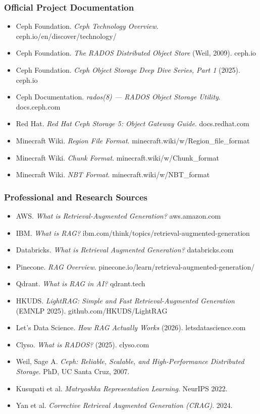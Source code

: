 \documentclass[11pt,letterpaper]{article}
\begin{document}
\subsubsection{Official Project Documentation}
\begin{itemize}[leftmargin=1.5em]
  \item Ceph Foundation. \textit{Ceph Technology Overview}. ceph.io/en/discover/technology/
  \item Ceph Foundation. \textit{The RADOS Distributed Object Store} (Weil, 2009). ceph.io
  \item Ceph Foundation. \textit{Ceph Object Storage Deep Dive Series, Part 1} (2025). ceph.io
  \item Ceph Documentation. \textit{rados(8) --- RADOS Object Storage Utility}. docs.ceph.com
  \item Red Hat. \textit{Red Hat Ceph Storage 5: Object Gateway Guide}. docs.redhat.com
  \item Minecraft Wiki. \textit{Region File Format}. minecraft.wiki/w/Region\_file\_format
  \item Minecraft Wiki. \textit{Chunk Format}. minecraft.wiki/w/Chunk\_format
  \item Minecraft Wiki. \textit{NBT Format}. minecraft.wiki/w/NBT\_format
\end{itemize}

\subsubsection{Professional and Research Sources}
\begin{itemize}[leftmargin=1.5em]
  \item AWS. \textit{What is Retrieval-Augmented Generation?} aws.amazon.com
  \item IBM. \textit{What is RAG?} ibm.com/think/topics/retrieval-augmented-generation
  \item Databricks. \textit{What is Retrieval Augmented Generation?} databricks.com
  \item Pinecone. \textit{RAG Overview}. pinecone.io/learn/retrieval-augmented-generation/
  \item Qdrant. \textit{What is RAG in AI?} qdrant.tech
  \item HKUDS. \textit{LightRAG: Simple and Fast Retrieval-Augmented Generation} (EMNLP 2025). github.com/HKUDS/LightRAG
  \item Let's Data Science. \textit{How RAG Actually Works} (2026). letsdatascience.com
  \item Clyso. \textit{What is RADOS?} (2025). clyso.com
  \item Weil, Sage A. \textit{Ceph: Reliable, Scalable, and High-Performance Distributed Storage}. PhD, UC Santa Cruz, 2007.
  \item Kusupati et al. \textit{Matryoshka Representation Learning}. NeurIPS 2022.
  \item Yan et al. \textit{Corrective Retrieval Augmented Generation (CRAG)}. 2024.
\end{itemize}
\end{document}
